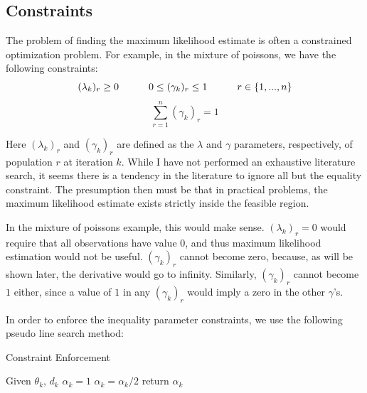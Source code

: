\documentclass[letter,12pt]{article}
\begin{document}
\subsection{Constraints}
The problem of finding the maximum likelihood estimate is often a constrained optimization problem.  For example, in the mixture of poissons, we have the following constraints:
\[
(\lambda_k)_r \geq 0 \indent \indent
0 \leq (\gamma_k)_r \leq 1 \indent \indent
r \in \{1,...,n\}
\]
\begin{equation} \label{eqn:equalityconstraint}
\sum_{r=1}^{n} (\gamma_k)_r = 1
\end{equation}

Here $(\lambda_k)_r$ and $(\gamma_k)_r$ are defined as the $\lambda$ and $\gamma$ parameters, respectively, of population $r$ at iteration $k$.  While I have not performed an exhaustive literature search, it seems there is a tendency in the literature to ignore all but the equality constraint.  The presumption then must be that in practical problems, the maximum likelihood estimate exists strictly inside the feasible region.  

In the mixture of poissons example, this would make sense.  $(\lambda_k)_r=0$ would require that all observations have value $0$, and thus maximum likelihood estimation would not be useful.  $(\gamma_k)_r$ cannot become zero, because, as will be shown later, the derivative would go to infinity.  Similarly, $(\gamma_k)_r$ cannot become $1$ either, since a value of $1$ in any $(\gamma_k)_r$ would imply a zero in the other $\gamma$'s.

In order to enforce the inequality parameter constraints, we use the following pseudo line search method:
 

\begin{algorithm}
\caption{Constraint Enforcement}
\label{alg:constraint_enforecement}
\begin{algorithmic}[1]
\State Given $\theta_k$, $d_k$
\State $\alpha_k = 1$
\State $\alpha_k = \alpha_k / 2$
\EndWhile
\State return $\alpha_k$
\end{algorithmic}
\end{algorithm}
\end{document}
